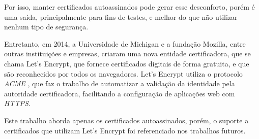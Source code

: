 Por isso, 
manter certificados
autoassinados pode gerar esse desconforto, porém é uma saída, principalmente para
fins de testes, e melhor do que não utilizar nenhum tipo de segurança.

Entretanto, em 2014, a Universidade de Michigan e a fundação Mozilla, entre outras 
instituições e empresas, criaram uma nova entidade certificadora, que se chama 
Let's Encrypt, que fornece certificados digitais de forma gratuita, e que são 
reconhecidos por todos os navegadores. Let's Encrypt utiliza o protocolo \textit{ACME} \cite{ACME}, que faz o trabalho de automatizar a validação da identidade pela autoridade 
certificadora, facilitando a configuração de aplicações web com \textit{HTTPS}. 

Este trabalho aborda apenas os certificados autoassinados, porém, o suporte
a certificados que utilizam Let's Encrypt foi referenciado nos trabalhos futuros.
